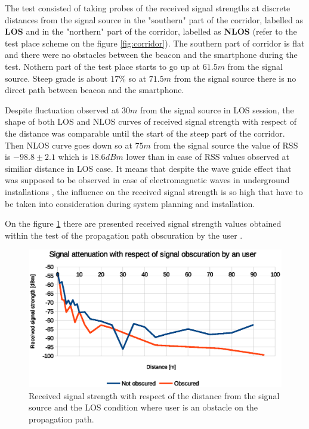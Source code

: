 \documentclass[../main.tex]{subfiles}
\begin{document}
The test consisted of taking probes of the received signal strengths at discrete distances from the signal source in the "southern" part of the corridor, labelled as \textbf{LOS} and in the "northern" part of the corridor, labelled as \textbf{NLOS} (refer to the test place scheme on the figure \ref{fig:corridor}). The southern part of corridor is flat and there were no obstacles between the beacon and the smartphone during the test. Nothern part of the test place starts to go up at $61.5 m$ from the signal source. Steep grade is about $17\%$ so at $71.5 m$ from the signal source there is no direct path between beacon and the smartphone.

Despite fluctuation observed at $30 m$ from the signal source in LOS session, the shape of both LOS and NLOS curves of received signal strength with respect of the distance was comparable until the start of the steep part of the corridor. Then NLOS curve goes down so at $75m$ from the signal source the value of RSS is $-98.8\pm2.1$ which is $18.6dBm$ lower than in case of RSS values observed at similiar distance in LOS case. It means that despite the wave guide effect that was supposed to be observed in case of electromagnetic waves in underground installations \cite{rf_in_tunnel_waveguide_effect}\cite{article_rf_propagation_practical_full}, the influence on the received signal strength is so high that have to be taken into consideration during system planning and installation.

On the figure \ref{fig:tests_case5_user_shadowing} there are presented received signal strength values obtained within the test of the propagation path obscuration by the user .

\begin{figure}[!htbp]
\includegraphics[width=\textwidth, keepaspectratio]{pictures/tests_case5_user_shadowing}
\centering
\caption{Received signal strength with respect of the distance from the signal source and the LOS condition where user is an obstacle on the propagation path.}
\label{fig:tests_case5_user_shadowing}
\end{figure}
\end{document}
